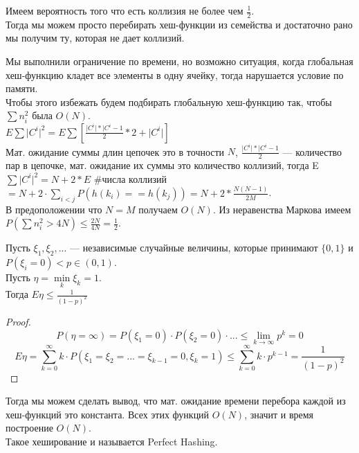 Имеем вероятность того что есть коллизия не более чем $\frac{1}{2}$. \\
Тогда мы можем просто перебирать хеш-функции из семейства и достаточно рано мы получим ту, которая не дает коллизий.

Мы выполнили ограничение по времени, но возможно ситуация, когда глобальная хеш-функцию кладет все элементы в одну ячейку, тогда нарушается условие по памяти. \\
Чтобы этого избежать будем подбирать глобальную хеш-функцию так, чтобы $\sum n_i ^2$ была  $O(N)$. \\
$E \sum \lvert C^i \rvert ^2 = E \sum [\frac{\lvert C^i \rvert * \lvert C^i - 1}{2} * 2 + \lvert C^i \rvert]$ \\
Мат. ожидание суммы длин цепочек это в точности $N$, $\frac{\lvert C^i \rvert * \lvert C^i - 1}{2}$ --- количество пар в цепочке, мат. ожидание их суммы это количество коллизий, 
тогда E $\sum \lvert C^i \rvert ^2 = N + 2 * E$ \#числа коллизий $ = N + 2 \cdot \sum \limits _{i < j} P(h(k_i) == h(k_j)) = N + 2 * \frac{N(N - 1)}{2M}$. \\
В предоположении что $N = M$ получаем  $O(N)$. 
Из неравенства Маркова имеем  $P(\sum n_i ^ 2 > 4N) \leq \frac{2N}{4N} = \frac{1}{2}$.

\begin{lemma}
    Пусть $\xi_1, \xi_2, ...$ ---  независимые случайные величины, которые принимают $\{0, 1\}$ и $P(\xi_i = 0) < p \in (0, 1)$. \\
    Пусть $\eta = \min \limits _k {\xi_k = 1}$. \\
    Тогда  $E\eta \leq \frac{1}{(1 - p)^2}$
\end{lemma}

\begin{proof} \ \\
    \[
        P(\eta = \infty) = P(\xi_1 = 0) \cdot P(\xi_2 = 0) \cdot ... \leq \lim_{k \to \infty} p^k = 0
    \]
    \[
        E\eta = \sum \limits _{k = 0}^{\infty} k \cdot P(\xi_1 = \xi_2 = ... = \xi_{k - 1} = 0, \xi_k = 1) \leq \sum \limits _{k = 0}^{\infty} k \cdot p ^ {k - 1} = \frac{1}{(1 - p)^2}
    \]
\end{proof}

Тогда мы можем сделать вывод, что мат. ожидание времени перебора каждой из хеш-функций это константа. Всех этих функций $O(N)$, значит и время построение  $O(N)$. \\
Такое хеширование и называется Perfect Hashing.
